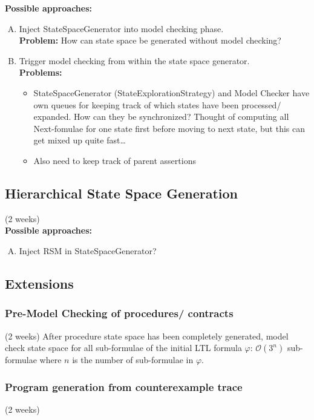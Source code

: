 \documentclass[a4paper,12pt]{article}
\begin{document}
\textbf{Possible approaches:}
\begin{enumerate}[(A)]
	\item Inject StateSpaceGenerator into model checking phase. \\
	\textbf{Problem:} How can state space be generated without model checking?
	\item	Trigger model checking from within the state space generator.\\
	\textbf{Problems:} 
	\begin{itemize}
		\item StateSpaceGenerator (StateExplorationStrategy) and Model Checker have own queues for keeping track of which states have been processed/ expanded. How can they be synchronized? Thought of computing all Next-fomulae for one state first before moving to next state, but this can get mixed up quite fast…
		\item Also need to keep track of parent assertions
	\end{itemize}
\end{enumerate}

\subsection{Hierarchical State Space Generation}
(2 weeks)\\

\textbf{Possible approaches:}
\begin{enumerate}[(A)]
\item Inject RSM in StateSpaceGenerator?
\end{enumerate}

\subsection{Extensions}	
\subsubsection{Pre-Model Checking of procedures/ contracts}
(2 weeks)
After procedure state space has been completely generated, model check state space for all sub-formulae of the initial LTL formula  $\varphi$: $\mathcal{O}(3^n)$ sub-formulae where $n$ is the number of sub-formulae in $\varphi$.	

\subsubsection{Program generation from counterexample trace}
(2 weeks)
\end{document}
